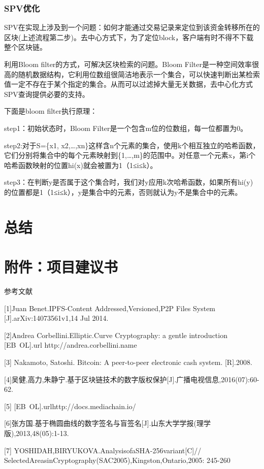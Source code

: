 \documentclass[withoutpreface,bwprint]{cumcmthesis} %
\begin{document}
\subsubsection{SPV优化}

SPV在实现上涉及到一个问题：如何才能通过交易记录来定位到该资金转移所在的区块(上述流程第二步)。去中心方式下，为了定位block，客户端有时不得不下载整个区块链。

利用Bloom filter的方式，可解决区块检索的问题。Bloom Filter是一种空间效率很高的随机数据结构，它利用位数组很简洁地表示一个集合，可以快速判断出某检索值一定不存在于某个指定的集合。从而可以过滤掉大量无关数据，去中心化方式SPV查询提供必要的支持。

下面是bloom filter执行原理：

step1：初始状态时，Bloom Filter是一个包含m位的位数组，每一位都置为0。

step2:对于S=\{x1, x2,…,xn\}这样含n个元素的集合，使用k个相互独立的哈希函数，它们分别将集合中的每个元素映射到\{1,…,m\}的范围中。对任意一个元素x，第i个哈希函数映射的位置hi(x)就会被置为1（1≤i≤k）。   

step3：在判断y是否属于这个集合时，我们对y应用k次哈希函数，如果所有hi(y)的位置都是1（1≤i≤k），y是集合中的元素，否则就认为y不是集合中的元素。

\section{总结}

\section*{附件：项目建议书}

参考文献

[1]Juan Benet.IPFS-Content Addressed,Versioned,P2P Files System [J].arXiv:14073561v1,14 Jul 2014.

[2]Andrea Corbellini.Elliptic.Curve Cryptography: a gentle introduction [EB\ OL].url{ http://andrea.corbellini.name}

[3] Nakamoto, Satoshi. Bitcoin: A peer-to-peer electronic cash system. [R].2008.

[4]吴健,高力,朱静宁.基于区块链技术的数字版权保护[J].广播电视信息,2016(07):60-62.

[5] [EB\ OL].url{http://docs.mediachain.io/}

[6]张方国.基于椭圆曲线的数字签名与盲签名[J].山东大学学报(理学版),2013,48(05):1-13.

[7] YOSHIDAH,BIRYUKOVA.AnalysisofaSHA-256variant[C]//
SelectedAreasinCryptography(SAC2005),Kingston,Ontario,2005:
245-260
\end{document}

